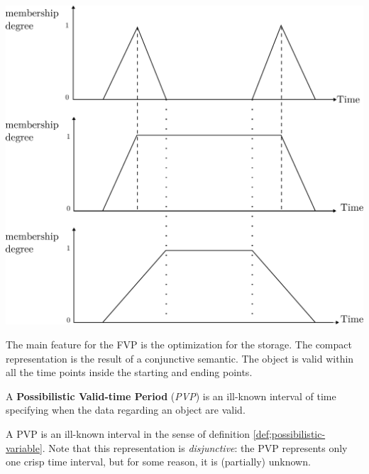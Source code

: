 \vspace*{13pt}
\begin{center}
{
\includegraphics[scale=0.25]{./graphs/comparisoncv.pdf}

}
\end{center}
\vspace*{10pt}
\vspace*{13pt}


The main feature for the FVP is the optimization for the storage. The compact representation is the result of a conjunctive semantic. The object is valid within all the time points inside the starting and ending points.


\begin{definition}
A \textbf{Possibilistic Valid-time Period} (\emph{PVP}) is an ill-known interval of time specifying when the data regarding an object are valid.
\end{definition}
A PVP is an ill-known interval in the sense of definition \ref{def;possibilistic-variable}. Note that this representation is \emph{disjunctive}: the PVP represents only one crisp time interval, but for some reason, it is (partially) unknown.


